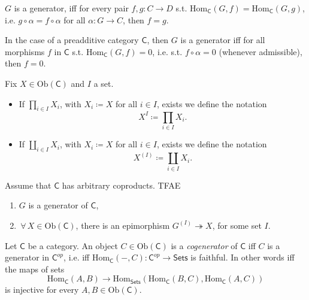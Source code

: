 \begin{rem}
	$G$ is a generator, iff for every pair $f,g\colon C \to D$
	s.t. $\mathrm{Hom}_{\mathsf{C}} \left( G, f \right) = \mathrm{Hom}_{\mathsf{C}} \left( G, g \right)$,
	i.e. $g \circ \alpha = f \circ \alpha$ for all $\alpha\colon G \to C$, then $f = g$.

	In the case of a preadditive category $\mathsf{C}$, then $G$ is a generator iff
	for all morphisms $f$ in $\mathsf{C}$ s.t. $\mathrm{Hom}_{\mathsf{C}} \left( G, f \right) = 0$,
	i.e. s.t. $f \circ \alpha = 0$ (whenever admissible), then $f = 0$.
\end{rem}

\begin{defn}
	Fix $X \in \mathrm{Ob} \left(\mathsf{C}\right)$ and $I$ a set.
	\begin{itemize}
		\item If $\prod_{i \in I} X_i$, with $X_i \coloneqq X$ for all $i \in I$, exists we define the notation
			\begin{equation}
			X^I \coloneqq \prod_{i \in I} X_i
			.\end{equation} 
		\item If $\coprod_{i \in I} X_i$, with $X_i \coloneqq X$ for all $i \in I$, exists we define the notation
			\begin{equation}
				X^{(I)} \coloneqq \coprod_{i \in I} X_i
			.\end{equation} 
	\end{itemize}
\end{defn}

\begin{prop}
	Assume that $\mathsf{C}$ has arbitrary coproducts.
	TFAE
	\begin{enumerate}
		\item $G$ is a generator of $\mathsf{C}$,
		\item $\,\forall\, X \in \mathrm{Ob} \left(\mathsf{C}\right)$, there is an epimorphism
			$G^{(I)} \twoheadrightarrow X$, for some set $I$.
	\end{enumerate}
\end{prop} 

\begin{defn}
	Let $\mathsf{C}$ be a category.
	An object $C \in \mathrm{Ob} \left(\mathsf{C}\right)$ is a {\em cogenerator} of $\mathsf{C}$ iff
	$C$ is a generator in $\mathsf{C}^{op}$, i.e. iff
	$\mathrm{Hom}_{\mathsf{C}} \left( -, C \right)\colon \mathsf{C}^{op} \to \mathsf{Sets}$ is faithful.
	In other words iff the maps of sets
	 \begin{equation}
	\mathrm{Hom}_{\mathsf{C}} \left( A, B \right) \to
	\mathrm{Hom}_{\mathsf{Sets}} \left( \mathrm{Hom}_{\mathsf{C}} \left( B, C \right), 
	\mathrm{Hom}_{\mathsf{C}} \left( A, C \right) \right)
	\end{equation} 
	is injective for every $A, B \in \mathrm{Ob} \left(\mathsf{C}\right)$.
\end{defn}

